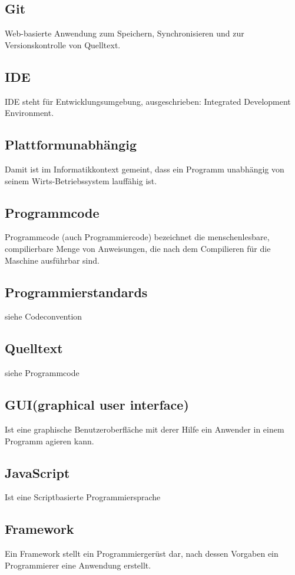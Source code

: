 \documentclass[11pt,a4paper]{article}
\begin{document}
\subsection{Git}
Web-basierte Anwendung zum Speichern, Synchronisieren und zur Versionskontrolle von Quelltext.

\subsection{IDE} 
IDE steht für Entwicklungsumgebung, ausgeschrieben: Integrated Development Environment.

\subsection{Plattformunabhängig} Damit ist im Informatikkontext gemeint, dass ein Programm unabhängig von seinem Wirts-Betriebssystem lauffähig ist.

\subsection{Programmcode} Programmcode (auch Programmiercode) bezeichnet die menschenlesbare, compilierbare Menge von Anweisungen, die nach dem Compilieren für die Maschine ausführbar sind.

\subsection{Programmierstandards}
siehe Codeconvention

\subsection{Quelltext}
siehe Programmcode

\subsection{GUI(graphical user interface)} Ist eine graphische Benutzeroberfläche mit derer Hilfe ein Anwender in einem Programm agieren kann.

\subsection{JavaScript} Ist eine Scriptbasierte Programmiersprache

\subsection{Framework}
Ein Framework stellt ein Programmiergerüst dar, nach dessen Vorgaben ein Programmierer eine Anwendung erstellt.
\end{document}
